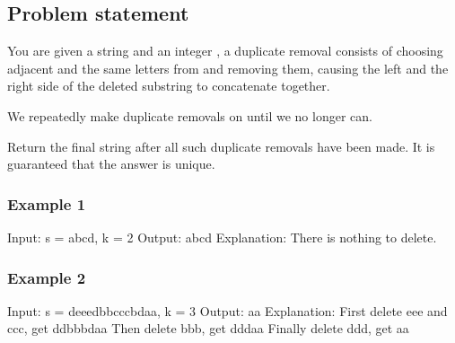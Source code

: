 \documentclass[letterpaper,12pt,english]{book}
\begin{document}
\subsection{Problem statement\sphinxfootnotemark[43]}
\label{\detokenize{Stack/1209_Remove_All_Adjacent_Duplicates_in_String_II:problem-statement}}%
\begin{footnotetext}[43]\sphinxAtStartFootnote
{}
%
\end{footnotetext}\ignorespaces 
\sphinxAtStartPar
You are given a string  and an integer , a  duplicate removal consists of choosing  adjacent and the same letters from  and removing them, causing the left and the right side of the deleted substring to concatenate together.

\sphinxAtStartPar
We repeatedly make  duplicate removals on  until we no longer can.

\sphinxAtStartPar
Return the final string after all such duplicate removals have been made. It is guaranteed that the answer is unique.


\subsubsection{Example 1}
\label{\detokenize{Stack/1209_Remove_All_Adjacent_Duplicates_in_String_II:example-1}}
\begin{sphinxVerbatim}[commandchars=\\\{\}]
Input: s = \PYGZdq{}abcd\PYGZdq{}, k = 2
Output: \PYGZdq{}abcd\PYGZdq{}
Explanation: There is nothing to delete.
\end{sphinxVerbatim}


\subsubsection{Example 2}
\label{\detokenize{Stack/1209_Remove_All_Adjacent_Duplicates_in_String_II:example-2}}
\begin{sphinxVerbatim}[commandchars=\\\{\}]
Input: s = \PYGZdq{}deeedbbcccbdaa\PYGZdq{}, k = 3
Output: \PYGZdq{}aa\PYGZdq{}
Explanation: 
First delete \PYGZdq{}eee\PYGZdq{} and \PYGZdq{}ccc\PYGZdq{}, get \PYGZdq{}ddbbbdaa\PYGZdq{}
Then delete \PYGZdq{}bbb\PYGZdq{}, get \PYGZdq{}dddaa\PYGZdq{}
Finally delete \PYGZdq{}ddd\PYGZdq{}, get \PYGZdq{}aa\PYGZdq{}
\end{sphinxVerbatim}
\end{document}
